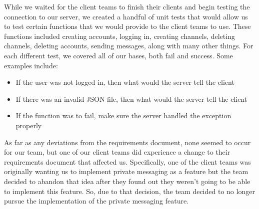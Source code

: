 \documentclass[oneside,12pt]{scrbook}
\begin{document}
While we waited for the client teams to finish their clients and begin testing the connection to our server, we created a handful of unit tests that would allow us to test certain functions that we would provide to the client teams to use.  These functions included creating accounts, logging in, creating channels, deleting channels, deleting accounts, sending messages, along with many other things.  For each different test, we covered all of our bases, both fail and success. Some examples include:

\begin{itemize}
    \item If the user was not logged in, then what would the server tell the client
    \item If there was an invalid JSON file, then what would the server tell the client
    \item If the function was to fail, make sure the server handled the exception properly
\end{itemize}

As far as any deviations from the requirements document, none seemed to occur for our team, but one of our client teams did experience a change to their requirements document that affected us. Specifically, one of the client teams was originally wanting us to implement private messaging as a feature but the team decided to abandon that idea after they found out they weren’t going to be able to implement this feature. So, due to that decision, the team decided to no longer pursue the implementation of the private messaging feature.
\end{document}

